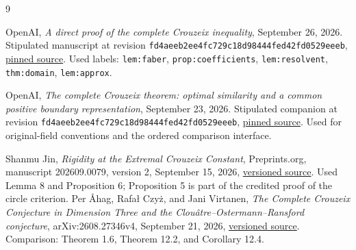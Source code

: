\begin{thebibliography}{9}
\raggedright
{}
OpenAI, \emph{A direct proof of the complete Crouzeix inequality},
September 26, 2026. Stipulated manuscript at revision
\texttt{fd4aeeb2ee4fc729c18d98444fed42fd0529eeeb},
\href{https://raw.githubusercontent.com/openai/math/fd4aeeb2ee4fc729c18d98444fed42fd0529eeeb/preprints/A-direct-proof-of-the-complete-Crouzeix-inequality-September-26-2026/build/main.tex}{pinned source}.
Used labels: \texttt{lem:faber}, \texttt{prop:coefficients},
\texttt{lem:resolvent}, \texttt{thm:domain}, \texttt{lem:approx}.

OpenAI, \emph{The complete Crouzeix theorem: optimal similarity and a
common positive boundary representation}, September 23, 2026.
Stipulated companion at revision
\texttt{fd4aeeb2ee4fc729c18d98444fed42fd0529eeeb},
\href{https://raw.githubusercontent.com/openai/math/fd4aeeb2ee4fc729c18d98444fed42fd0529eeeb/preprints/The-complete-Crouzeix-theorem-September-23-2026/build/main.tex}{pinned source}.
Used for original-field conventions and the ordered comparison interface.

Shanmu Jin, \emph{Rigidity at the Extremal Crouzeix Constant},
Preprints.org, manuscript 202609.0079, version 2, September 15, 2026,
\href{https://www.preprints.org/manuscript/202609.0079/v2}{versioned source}.
Used Lemma 8 and Proposition 6; Proposition 5 is part of the credited
proof of the circle criterion.
Per \AA hag, Rafa\l{} Czy\.z, and Jani Virtanen,
\emph{The Complete Crouzeix Conjecture in Dimension Three and the
Clou\^atre--Ostermann--Ransford conjecture}, arXiv:2608.27346v4,
September 21, 2026,
\href{https://arxiv.org/html/2608.27346v4}{versioned source}.
Comparison: Theorem 1.6, Theorem 12.2, and Corollary 12.4.
\end{thebibliography}
